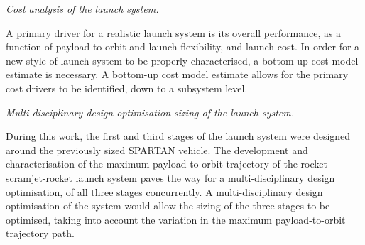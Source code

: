 \vspace{10pt}
 \textit{Cost analysis of the launch system.}

 \noindent
A primary driver for a realistic launch system is its overall performance, as a function of payload-to-orbit and launch flexibility, and launch cost. In order for a new style of launch system to be properly characterised, a bottom-up cost model estimate is necessary. A bottom-up cost model estimate allows for the primary cost drivers to be identified, down to a subsystem level. 

\vspace{10pt}
 \textit{Multi-disciplinary design optimisation sizing of the launch system.}

 \noindent
During this work, the first and third stages of the launch system were designed around the previously sized SPARTAN vehicle.
The development and characterisation of the maximum payload-to-orbit trajectory of the rocket-scramjet-rocket launch system paves the way for a multi-disciplinary design optimisation, of all three stages concurrently. A multi-disciplinary design optimisation of the system would allow the sizing of the three stages to be optimised, taking into account the variation in the maximum payload-to-orbit trajectory path.  






